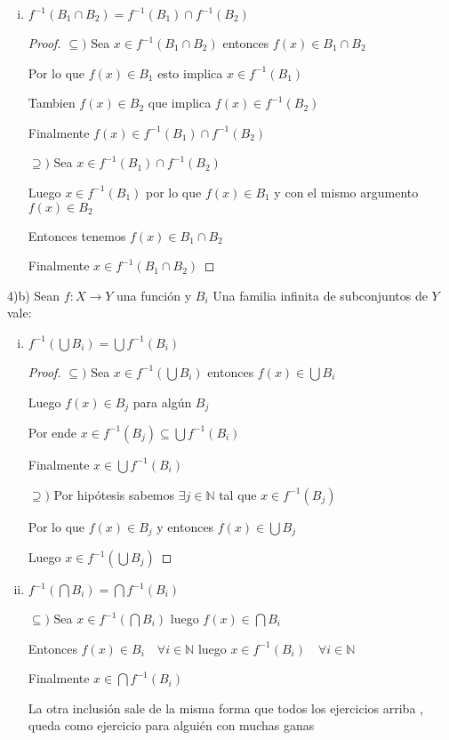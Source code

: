 \documentclass[12pt]{article}
\newcommand{\N}{\mathbb{N}}
\newcommand{\ra}{\rightarrow}
\theoremstyle{definition}
\begin{document}
\begin{enumerate}[i.]
\begin{proof}
	Luego $x \in f^{-1}(B_{1})$ entonces $f(x) \in B_{1}$

	Por tanto $f(x) \in B_{1} \cup B_{2}$

	Finalmente $x \in f^{-1}(B_{1} \cup B_{2})$
      \end{proof}

    \item $f^{-1}(B_{1} \cap B_{2}) = f^{-1}(B_{1}) \cap f^{-1}(B_{2})$
      \begin{proof}
        $\subseteq )$ Sea $x \in f^{-1}(B_{1} \cap B_{2})$ entonces $f(x) \in B_{1} \cap B_{2}$

	Por lo que $f(x) \in B_{1}$ esto implica $x \in f^{-1}(B_{1})$

	Tambien $f(x) \in B_{2}$ que implica $f(x) \in f^{-1}(B_{2})$

	Finalmente $f(x) \in f^{-1}(B_{1}) \cap f^{-1}(B_{2})$

        $\supseteq )$ Sea $x \in f^{-1}(B_{1}) \cap f^{-1}(B_{2})$

        Luego $x \in f^{-1}(B_{1})$ por lo que $f(x) \in B_{1}$ y con el mismo argumento $f(x) \in B_{2}$

	Entonces tenemos $f(x) \in B_{1} \cap B_{2} $

        Finalmente $x \in f^{-1}(B_{1} \cap B_{2})$
      \end{proof}
 \end{enumerate}

4)b) Sean $f: X \ra Y$ una función y $B_{i}$ Una familia infinita de subconjuntos de $Y$ vale:

\begin{enumerate}[i.]
  \item $f^{-1}(\bigcup B_{i}) = \bigcup f^{-1}(B_{i})$
    \begin{proof}
      $\subseteq )$ Sea $x \in f^{-1}(\bigcup B_{i})$ entonces $f(x) \in \bigcup B_{i}$

      Luego $f(x) \in B_{j}$ para algún $B_{j}$

      Por ende $x \in f^{-1}(B_{j}) \subseteq \bigcup f^{-1}(B_{i})$

      Finalmente $x \in \bigcup f^{-1}(B_{i})$

      $\supseteq )$ Por hipótesis sabemos $\exists j \in \N$ tal que $x \in f^{-1}(B_{j})$

      Por lo que $f(x) \in B_{j}$ y entonces $f(x) \in \bigcup B_{j}$

      Luego $x \in f^{-1} (\bigcup B_{j})$
    \end{proof}
  \item $f^{-1}(\bigcap B_{i}) = \bigcap f^{-1}(B_{i})$

    $\subseteq )$ Sea $x \in f^{-1}(\bigcap B_{i})$ luego $f(x) \in \bigcap B_{i}$

    Entonces $f(x) \in B_{i} \quad \forall i \in \N$ luego $x \in f^{-1}(B_{i}) \quad \forall i \in \N$

    Finalmente $x \in \bigcap f^{-1}(B_{i})$

    La otra inclusión sale de la misma forma que todos los ejercicios arriba , queda como ejercicio para alguién con muchas ganas

\end{enumerate}
\end{document}
